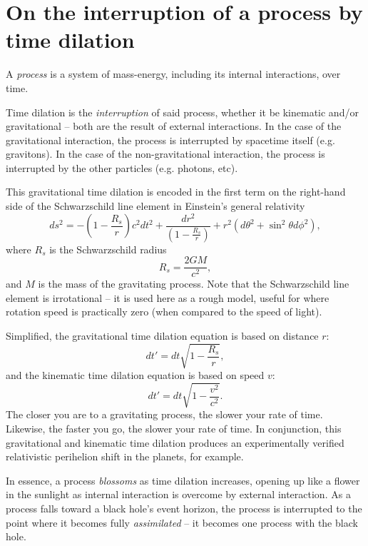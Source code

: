 \documentclass[12pt]{article}
\begin{document}
\section{On the interruption of a process by time dilation}

A {\textit{process}} is a system of mass-energy, including its internal interactions, over time.

Time dilation is the {\textit{interruption}} of said process, whether it be kinematic and/or gravitational -- both are the result of external interactions.
In the case of the gravitational interaction, the process is interrupted by spacetime itself (e.g. gravitons).
In the case of the non-gravitational interaction, the process is interrupted by the other particles (e.g. photons, etc).

This gravitational time dilation \cite{misner} is encoded in the first term on the right-hand side of the Schwarzschild line element in Einstein's general relativity
\begin{equation}
ds^2 = -\left( 1 - \frac{R_s}{r} \right) c^2 dt^2 + \frac{dr^2}{\left( 1 - \frac{R_s}{r} \right)} + r^2 (d\theta^2 + \sin^2 \theta d\phi^2),
\end{equation}
where $R_s$ is the Schwarzschild radius
\begin{equation}
R_s = \frac{2GM}{c^2},
\end{equation}
and $M$ is the mass of the gravitating process.
Note that the Schwarzschild line element is irrotational -- it is used here as a rough model, useful for where rotation speed is practically zero (when compared to the speed of light).

Simplified, the gravitational time dilation equation is based on distance $r$:
\begin{equation}
dt' = dt \sqrt{1 - \frac{R_s}{r}},
\end{equation}
and the kinematic time dilation equation is based on speed $v$:
\begin{equation}
dt' = dt \sqrt{1 - \frac{v^2}{c^2}}.
\end{equation}
The closer you are to a gravitating process, the slower your rate of time.
Likewise, the faster you go, the slower your rate of time.
In conjunction, this gravitational and kinematic time dilation produces an experimentally verified relativistic perihelion shift in the planets, for example.

In essence, a process {\textit{blossoms}} as time dilation increases, opening up like a flower in the sunlight as internal interaction is overcome by external interaction.
As a process falls toward a black hole's event horizon, the process is interrupted to the point where it becomes fully {\textit{assimilated}} -- it becomes one process with the black hole.
\end{document}
